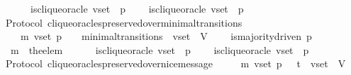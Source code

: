\begin{isabellebody}
\ \ \ \ \ \ {\isasymand}\ is{\isacharunderscore}clique{\isacharunderscore}oracle\ {\isacharparenleft}v{\isacharunderscore}set{\isacharcomma}\ {\isasymsigma}{\isacharcomma}\ p{\isacharparenright}\ \isanewline
\ \ {\isasymlongrightarrow}\ is{\isacharunderscore}clique{\isacharunderscore}oracle\ {\isacharparenleft}v{\isacharunderscore}set{\isacharcomma}\ {\isasymsigma}{\isacharprime}{\isacharcomma}\ p{\isacharparenright}{\isachardoublequoteclose}\isanewline
%
\isadelimproof
\ \ %
\endisadelimproof
%
\isatagproof
{}\isamarkupfalse%
%
\endisatagproof
{\isafoldproof}%
%
\isadelimproof
\isanewline
%
\endisadelimproof
\isanewline
\isanewline
{}\isamarkupfalse%
\ {\isacharparenleft}\ Protocol{\isacharparenright}\ clique{\isacharunderscore}oracles{\isacharunderscore}preserved{\isacharunderscore}over{\isacharunderscore}minimal{\isacharunderscore}transitions\ {\isacharcolon}\isanewline
\ \ {\isachardoublequoteopen}{\isasymforall}\ {\isasymsigma}\ {\isasymsigma}{\isacharprime}\ m{\isacharprime}\ v{\isacharunderscore}set\ p{\isachardot}\ {\isacharparenleft}{\isasymsigma}{\isacharcomma}\ {\isasymsigma}{\isacharprime}{\isacharparenright}\ {\isasymin}\ minimal{\isacharunderscore}transitions\ {\isasymand}\ v{\isacharunderscore}set\ {\isasymsubseteq}\ V\ \isanewline
\ \ {\isasymlongrightarrow}\ is{\isacharunderscore}majority{\isacharunderscore}driven\ p\isanewline
\ \ {\isasymlongrightarrow}\ m{\isacharprime}\ {\isacharequal}\ the{\isacharunderscore}elem\ {\isacharparenleft}{\isasymsigma}{\isacharprime}\ {\isacharminus}\ {\isasymsigma}{\isacharparenright}\isanewline
\ \ {\isasymlongrightarrow}\ is{\isacharunderscore}clique{\isacharunderscore}oracle\ {\isacharparenleft}v{\isacharunderscore}set{\isacharcomma}\ {\isasymsigma}{\isacharcomma}\ p{\isacharparenright}\ \isanewline
\ \ {\isasymlongrightarrow}\ is{\isacharunderscore}clique{\isacharunderscore}oracle\ {\isacharparenleft}v{\isacharunderscore}set{\isacharcomma}\ {\isasymsigma}{\isacharprime}{\isacharcomma}\ p{\isacharparenright}{\isachardoublequoteclose}\isanewline
%
\isadelimproof
\ \ %
\endisadelimproof
%
\isatagproof
{}\isamarkupfalse%
%
\endisatagproof
{\isafoldproof}%
%
\isadelimproof
\isanewline
%
\endisadelimproof
\isanewline
{}\isamarkupfalse%
\ {\isacharparenleft}\ Protocol{\isacharparenright}\ clique{\isacharunderscore}oracles{\isacharunderscore}preserved{\isacharunderscore}over{\isacharunderscore}nice{\isacharunderscore}message\ {\isacharcolon}\isanewline
\ \ {\isachardoublequoteopen}{\isasymforall}\ {\isasymsigma}\ m{\isacharprime}\ v{\isacharunderscore}set\ p{\isachardot}\ {\isasymsigma}\ {\isasymin}\ {\isasymSigma}t\ {\isasymand}\ v{\isacharunderscore}set\ {\isasymsubseteq}\ V\ \isanewline

\end{isabellebody}
